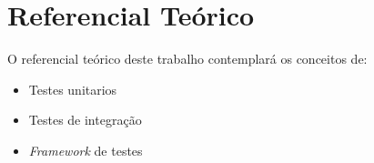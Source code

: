 \chapter{Referencial Teórico}

O referencial teórico deste trabalho contemplará os conceitos de:

\begin{itemize}

	\item Testes unitarios
	\item Testes de integração
	\item \textit{Framework} de testes
	
\end{itemize}

